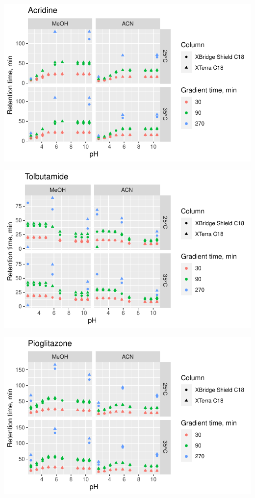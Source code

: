 \documentclass[
  letterpaper,
  DIV=11,
  numbers=noendperiod]{scrreprt}
\begin{document}
\includegraphics{index_files/figure-pdf/unnamed-chunk-3-3.pdf}

\includegraphics{index_files/figure-pdf/unnamed-chunk-3-4.pdf}

\includegraphics{index_files/figure-pdf/unnamed-chunk-3-5.pdf}
\end{document}
